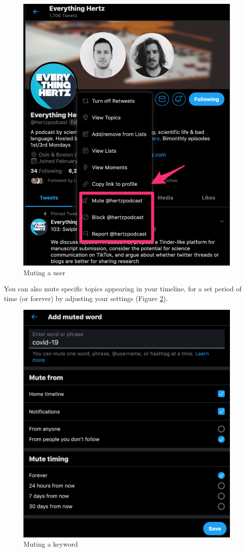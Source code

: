\documentclass[
]{book}
\begin{document}
\begin{figure}

{\centering \includegraphics[width=0.8\linewidth]{images/mute} 

}

\caption{Muting a user}\label{fig:mute}
\end{figure}

You can also mute specific topics appearing in your timeline, for a set period of time (or forever) by adjusting your settings (Figure \ref{fig:mute-word}).

\begin{figure}

{\centering \includegraphics[width=0.8\linewidth]{images/mute_word} 

}

\caption{Muting a keyword}\label{fig:mute-word}
\end{figure}
\end{document}
